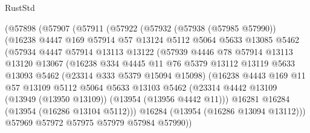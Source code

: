 \begin{lexlean}{RustStd}
\begin{coremodule}
              (@57898
                (@57907
                  (@57911
                    (@57922
                      (@57932
                        (@57938 (@57985 @57990))
                        (@16238
                          @4447
                          @169
                          @57914
                          @57
                          @13124
                          @5112
                          @5064
                          @5633
                          @13085
                          @5462
                          (@57934
                            @4447
                            @57914
                            @13113
                            @13122
                            (@57939
                              @4446
                              @78
                              @57914
                              @13113
                              @13120
                              @13067
                              (@16238
                                @334
                                @4445
                                @11
                                @76
                                @5379
                                @13112
                                @13119
                                @5633
                                @13093
                                @5462
                                (@23314 @333 @5379 @15094 @15098)
                                (@16238
                                  @4443
                                  @169
                                  @11
                                  @57
                                  @13109
                                  @5112
                                  @5064
                                  @5633
                                  @13103
                                  @5462
                                  (@23314
                                    @4442
                                    @13109
                                    (@13949 (@13950 @13109))
                                    (@13954 (@13956 @4442 @11)))
                                  @16281
                                  @16284
                                  (@13954 (@16286 @13104 @5112)))
                                @16284
                                (@13954 (@16286 @13094 @13112)))
                              @57969
                              @57972
                              @57975
                              @57979
                              @57984
                              @57990))

\end{coremodule}
\end{lexlean}
